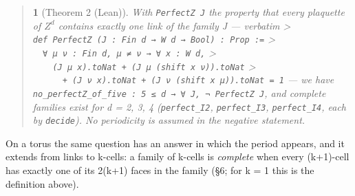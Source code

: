 \documentclass[11pt,a4paper]{article}
\theoremstyle{named}
\newtheorem*{namedthm}{}
\begin{document}
\begin{quote}
\begin{namedthm}[Theorem 2 (Lean)]
With \texttt{PerfectZ\ \allowbreak{}J} the property that every plaquette of $Z^d$ contains exactly one link of the family J — verbatim \textgreater{} \texttt{def\ \allowbreak{}PerfectZ\ \allowbreak{}(J\ \allowbreak{}:\ \allowbreak{}Fin\ \allowbreak{}d\ \allowbreak{}→\ \allowbreak{}W\ \allowbreak{}d\ \allowbreak{}→\ \allowbreak{}Bool)\ \allowbreak{}:\ \allowbreak{}Prop\ \allowbreak{}:=} \textgreater{} \texttt{\ \allowbreak{}\ \allowbreak{}∀\ \allowbreak{}μ\ \allowbreak{}ν\ \allowbreak{}:\ \allowbreak{}Fin\ \allowbreak{}d,\ \allowbreak{}μ\ \allowbreak{}≠\ \allowbreak{}ν\ \allowbreak{}→\ \allowbreak{}∀\ \allowbreak{}x\ \allowbreak{}:\ \allowbreak{}W\ \allowbreak{}d,} \textgreater{} \texttt{\ \allowbreak{}\ \allowbreak{}\ \allowbreak{}\ \allowbreak{}(J\ \allowbreak{}μ\ \allowbreak{}x).\allowbreak{}toNat\ \allowbreak{}+\ \allowbreak{}(J\ \allowbreak{}μ\ \allowbreak{}(shift\ \allowbreak{}x\ \allowbreak{}ν)).\allowbreak{}toNat} \textgreater{} \texttt{\ \allowbreak{}\ \allowbreak{}\ \allowbreak{}\ \allowbreak{}\ \allowbreak{}\ \allowbreak{}+\ \allowbreak{}(J\ \allowbreak{}ν\ \allowbreak{}x).\allowbreak{}toNat\ \allowbreak{}+\ \allowbreak{}(J\ \allowbreak{}ν\ \allowbreak{}(shift\ \allowbreak{}x\ \allowbreak{}μ)).\allowbreak{}toNat\ \allowbreak{}=\ \allowbreak{}1} — we have \texttt{no\_\allowbreak{}perfectZ\_\allowbreak{}of\_\allowbreak{}five\ \allowbreak{}:\ \allowbreak{}5\ \allowbreak{}≤\ \allowbreak{}d\ \allowbreak{}→\ \allowbreak{}∀\ \allowbreak{}J,\ \allowbreak{}¬\ \allowbreak{}PerfectZ\ \allowbreak{}J}, and complete families exist for d = 2, 3, 4 (\texttt{perfect\_\allowbreak{}I2}, \texttt{perfect\_\allowbreak{}I3}, \texttt{perfect\_\allowbreak{}I4}, each by \texttt{decide}). No periodicity is assumed in the negative statement.
\end{namedthm}
\end{quote}
On a torus the same question has an answer in which the period appears, and it extends from links to k-cells: a family of k-cells is \textit{complete} when every (k+1)-cell has exactly one of its 2(k+1) faces in the family (§6; for k = 1 this is the definition above).
\end{document}
